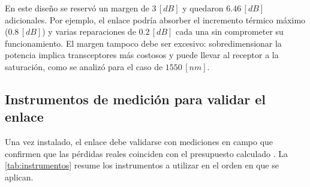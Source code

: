 En este diseño se reservó un margen de $3 \, [dB]$ y quedaron $6.46 \, [dB]$ adicionales. Por ejemplo, el enlace podría absorber el incremento térmico máximo ($0.8 \, [dB]$) y varias reparaciones de $0.2 \, [dB]$ cada una sin comprometer su funcionamiento. El margen tampoco debe ser excesivo: sobredimensionar la potencia implica transceptores más costosos y puede llevar al receptor a la saturación, como se analizó para el caso de $1550 \, [nm]$.


\subsection{Instrumentos de medición para validar el enlace}
\label{sec_5.4}
Una vez instalado, el enlace debe validarse con mediciones en campo que confirmen que las pérdidas reales coinciden con el presupuesto calculado \cite{b7, b17}. La \autoref{tab:instrumentos} resume los instrumentos a utilizar en el orden en que se aplican.

